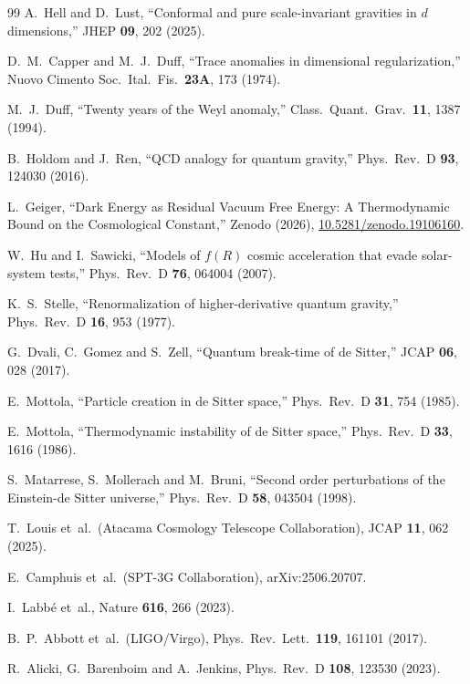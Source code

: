 \documentclass[aps,prd,twocolumn,superscriptaddress,nofootinbib]{revtex4-2}
\begin{document}
\begin{thebibliography}{99}
A.~Hell and D.~Lust,
``Conformal and pure scale-invariant gravities in $d$ dimensions,''
JHEP \textbf{09}, 202 (2025).

D.~M.~Capper and M.~J.~Duff,
``Trace anomalies in dimensional regularization,''
Nuovo Cimento Soc.\ Ital.\ Fis.\ \textbf{23A}, 173 (1974).

M.~J.~Duff,
``Twenty years of the Weyl anomaly,''
Class.\ Quant.\ Grav.\ \textbf{11}, 1387 (1994).

B.~Holdom and J.~Ren,
``QCD analogy for quantum gravity,''
Phys.\ Rev.\ D \textbf{93}, 124030 (2016).


L.~Geiger,
``Dark Energy as Residual Vacuum Free Energy: A Thermodynamic Bound on the Cosmological Constant,''
Zenodo (2026), \href{https://doi.org/10.5281/zenodo.19106160}{10.5281/zenodo.19106160}.

W.~Hu and I.~Sawicki,
``Models of $f(R)$ cosmic acceleration that evade solar-system tests,''
Phys.\ Rev.\ D \textbf{76}, 064004 (2007).

K.~S.~Stelle,
``Renormalization of higher-derivative quantum gravity,''
Phys.\ Rev.\ D \textbf{16}, 953 (1977).

G.~Dvali, C.~Gomez and S.~Zell,
``Quantum break-time of de Sitter,''
JCAP \textbf{06}, 028 (2017).

E.~Mottola,
``Particle creation in de Sitter space,''
Phys.\ Rev.\ D \textbf{31}, 754 (1985).

E.~Mottola,
``Thermodynamic instability of de Sitter space,''
Phys.\ Rev.\ D \textbf{33}, 1616 (1986).

S.~Matarrese, S.~Mollerach and M.~Bruni,
``Second order perturbations of the Einstein-de Sitter universe,''
Phys.\ Rev.\ D \textbf{58}, 043504 (1998).

T.~Louis et~al.\ (Atacama Cosmology Telescope Collaboration),
JCAP \textbf{11}, 062 (2025).

E.~Camphuis et~al.\ (SPT-3G Collaboration),
arXiv:2506.20707.

I.~Labb\'e et~al.,
Nature \textbf{616}, 266 (2023).

B.~P.~Abbott et~al.\ (LIGO/Virgo),
Phys.\ Rev.\ Lett.\ \textbf{119}, 161101 (2017).

R.~Alicki, G.~Barenboim and A.~Jenkins,
Phys.\ Rev.\ D \textbf{108}, 123530 (2023).


\end{thebibliography}
\end{document}
